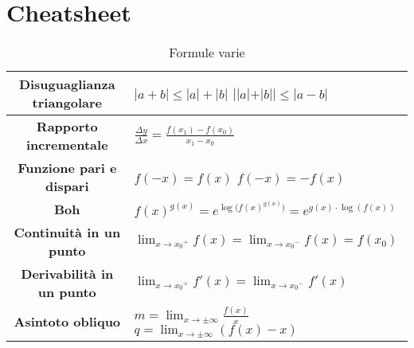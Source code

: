 \newpage
\section{Cheatsheet}

\begin{table}[h!]
	\setlength{\tabcolsep}{7pt}
	\renewcommand{\arraystretch}{2}
	\centering
	\begin{tabular}{|c|P{180px}|}
		\hline
		\textbf{Disuguaglianza triangolare} &  \\
		\hline
		\textbf{Rapporto incrementale} & $\frac{\Delta y}{\Delta x} = \frac{f(x_1)-f(x_0)}{x_1-x_0}$ \\
		\hline
		\textbf{Funzione pari e dispari} &  \\
		\hline
		\textbf{Boh} & $f(x)^{g(x)} = e^{{\log{(f(x)}^ {g(x)})}} = e^{ g(x) \cdot \log{(f(x))}}$ \\
		\hline
		\textbf{Continuità in un punto} & $\lim_{x \rightarrow {x_0}^+} f(x) = \lim_{x \rightarrow {x_0}^-} f(x) = f(x_0)$ \\
		\hline
		\textbf{Derivabilità in un punto} & $\lim_{x \rightarrow {x_0}^+} f'(x) = \lim_{x \rightarrow {x_0}^-} f'(x)$\\
		\hline
		\textbf{Asintoto obliquo} & \\
		\hline
		
	\end{tabular}
	\caption{Formule varie}
\end{table}

